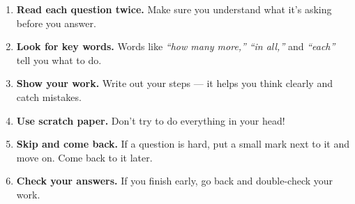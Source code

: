 {%
\begin{tcolorbox}[
    enhanced,
    colback=funBlueLight,
    colframe=funBlue!50,
    arc=10pt,
    outer arc=10pt,
    boxrule=1.5pt,
    left=5mm, right=5mm, top=4mm, bottom=4mm,
    title={\textcolor{white}{\faPen~During the Test}},
    colbacktitle=funBlue!70,
    fonttitle=\bfseries\sffamily,
]
    \small
    \renewcommand{\labelenumi}{\textcolor{funBlueDark}{\textbf{\arabic{enumi}.}}}
    \begin{enumerate}[leftmargin=*, itemsep=4pt]
        \item \textbf{Read each question twice.}
            Make sure you understand what it's asking before you answer.
        \item \textbf{Look for key words.}
            Words like \textit{``how many more,''} \textit{``in all,''} and
            \textit{``each''} tell you what to do.
        \item \textbf{Show your work.}
            Write out your steps --- it helps you think clearly and catch mistakes.
        \item \textbf{Use scratch paper.}
            Don't try to do everything in your head!
        \item \textbf{Skip and come back.}
            If a question is hard, put a small mark next to it and move on.
            Come back to it later.
        \item \textbf{Check your answers.}
            If you finish early, go back and double-check your work.
    \end{enumerate}
\end{tcolorbox}

\vspace{2mm}

}
